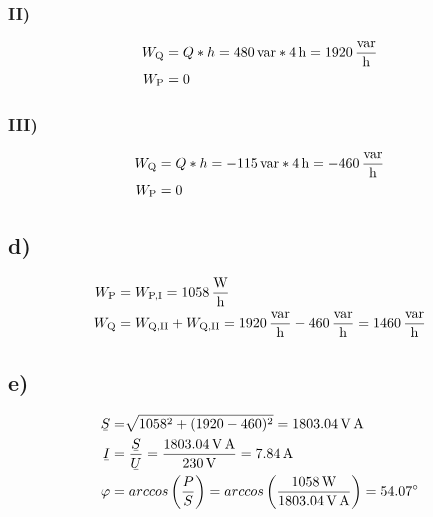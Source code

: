 \documentclass[../../document.tex]{subfiles}
\begin{document}
\subsubsection*{II)}

\begin{equation*}
    \begin{split}
        W_{\textrm{Q}} &= Q * h = \SI{480}{var} * \SI{4}{\hour} = \SI{1920}{\frac{var}{\hour}}\\
        W_{\textrm{P}} &= 0\\
    \end{split}
\end{equation*}

\subsubsection*{III)}

\begin{equation*}
    \begin{split}
        W_{\textrm{Q}} &= Q * h = \SI{-115}{var} * \SI{4}{\hour} = \SI{-460}{\frac{var}{\hour}}\\
        W_{\textrm{P}} &= 0\\
    \end{split}
\end{equation*}

\subsection*{d)}

\begin{equation*}
    \begin{split}
        W_{\textrm{P}} &= W_{\textrm{P,I}} = \SI{1058}{\frac{\watt}{\hour}} \\
        W_{\textrm{Q}} &= W_{\textrm{Q,II}} + W_{\textrm{Q,II}} = \SI{1920}{\frac{var}{\hour}} - \SI{460}{\frac{var}{\hour}} = \SI{1460}{\frac{var}{\hour}}
    \end{split}
\end{equation*}

\subsection*{e)}

\begin{equation*}
    \begin{split}
        \ubar{S} &= \sqrt[]{1058^2 + (1920 - 460)^2} = \SI{1803,04}{\volt\ampere}\\
        \ubar{I} &= \frac{\ubar{S}}{\ubar{U}} = \frac{\SI{1803,04}{\volt\ampere}}{\SI{230}{\volt}} = \SI{7,84}{\ampere}\\
        \varphi &= arccos\left(\frac{P}{S}\right) = arccos\left(\frac{\SI{1058}{\watt}}{\SI{1803,04}{\volt\ampere}}\right) = \SI{54,07}{\degree}\\
    \end{split}
\end{equation*}
\end{document}
